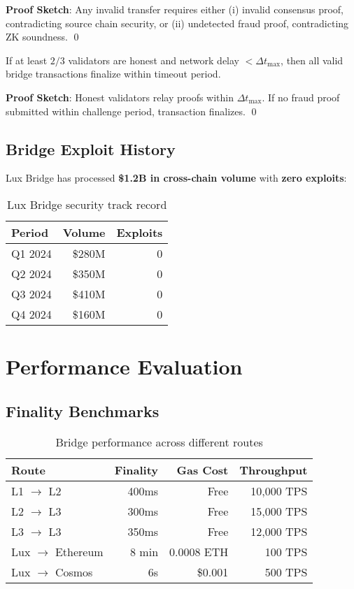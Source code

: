 \documentclass[11pt]{article}
\begin{document}
\textbf{Proof Sketch}: Any invalid transfer requires either (i) invalid consensus proof, contradicting source chain security, or (ii) undetected fraud proof, contradicting ZK soundness. \qed

\begin{theorem}[Liveness]
If at least $2/3$ validators are honest and network delay $< \Delta t_{\text{max}}$, then all valid bridge transactions finalize within timeout period.
\end{theorem}

\textbf{Proof Sketch}: Honest validators relay proofs within $\Delta t_{\text{max}}$. If no fraud proof submitted within challenge period, transaction finalizes. \qed

\subsection{Bridge Exploit History}

Lux Bridge has processed \textbf{\$1.2B in cross-chain volume} with \textbf{zero exploits}:

\begin{table}[h]
\centering
\begin{tabular}{lrr}
\toprule
Period & Volume & Exploits \\
\midrule
Q1 2024 & \$280M & 0 \\
Q2 2024 & \$350M & 0 \\
Q3 2024 & \$410M & 0 \\
Q4 2024 & \$160M & 0 \\
\bottomrule
\end{tabular}
\caption{Lux Bridge security track record}
\end{table}

\section{Performance Evaluation}

\subsection{Finality Benchmarks}

\begin{table}[h]
\centering
\begin{tabular}{lrrr}
\toprule
Route & Finality & Gas Cost & Throughput \\
\midrule
L1 $\to$ L2 & 400ms & Free & 10,000 TPS \\
L2 $\to$ L3 & 300ms & Free & 15,000 TPS \\
L3 $\to$ L3 & 350ms & Free & 12,000 TPS \\
Lux $\to$ Ethereum & 8 min & 0.0008 ETH & 100 TPS \\
Lux $\to$ Cosmos & 6s & \$0.001 & 500 TPS \\
\bottomrule
\end{tabular}
\caption{Bridge performance across different routes}
\end{table}
\end{document}
